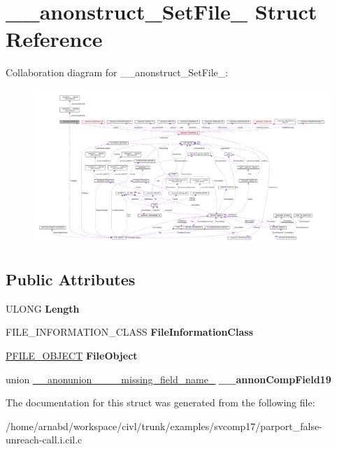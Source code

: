 \hypertarget{struct____anonstruct__SetFile__60}{}\section{\+\_\+\+\_\+anonstruct\+\_\+\+Set\+File\+\_ Struct Reference}
\label{struct____anonstruct__SetFile__60}


Collaboration diagram for \+\_\+\+\_\+anonstruct\+\_\+\+Set\+File\+\_\+:
\nopagebreak
\begin{figure}[H]
\begin{center}
\leavevmode
\includegraphics[width=350pt]{struct____anonstruct__SetFile__60__coll__graph}
\end{center}
\end{figure}
\subsection*{Public Attributes}
\begin{DoxyCompactItemize}
\item 
\hypertarget{struct____anonstruct__SetFile__60_a43cfd8ea5630c511a89dda7984f52fa8}{}U\+L\+O\+N\+G {\bfseries Length}\label{struct____anonstruct__SetFile__60_a43cfd8ea5630c511a89dda7984f52fa8}

\item 
\hypertarget{struct____anonstruct__SetFile__60_abfab2a5ef3e88b6413c0d73ca3490179}{}F\+I\+L\+E\+\_\+\+I\+N\+F\+O\+R\+M\+A\+T\+I\+O\+N\+\_\+\+C\+L\+A\+S\+S {\bfseries File\+Information\+Class}\label{struct____anonstruct__SetFile__60_abfab2a5ef3e88b6413c0d73ca3490179}

\item 
\hypertarget{struct____anonstruct__SetFile__60_af67efc9c0c51d9cd2a75d201821c4b24}{}\hyperlink{struct__FILE__OBJECT}{P\+F\+I\+L\+E\+\_\+\+O\+B\+J\+E\+C\+T} {\bfseries File\+Object}\label{struct____anonstruct__SetFile__60_af67efc9c0c51d9cd2a75d201821c4b24}

\item 
\hypertarget{struct____anonstruct__SetFile__60_a7efd59032cf0e223e49d2b78435dd1fc}{}union \hyperlink{union____anonunion________missing__field__name__61}{\+\_\+\+\_\+anonunion\+\_\+\+\_\+\+\_\+\+\_\+missing\+\_\+field\+\_\+name\+\_} {\bfseries \+\_\+\+\_\+annon\+Comp\+Field19}\label{struct____anonstruct__SetFile__60_a7efd59032cf0e223e49d2b78435dd1fc}

\end{DoxyCompactItemize}


The documentation for this struct was generated from the following file\+:\begin{DoxyCompactItemize}
\item 
/home/arnabd/workspace/civl/trunk/examples/svcomp17/parport\+\_\+false-\/unreach-\/call.\+i.\+cil.\+c\end{DoxyCompactItemize}
